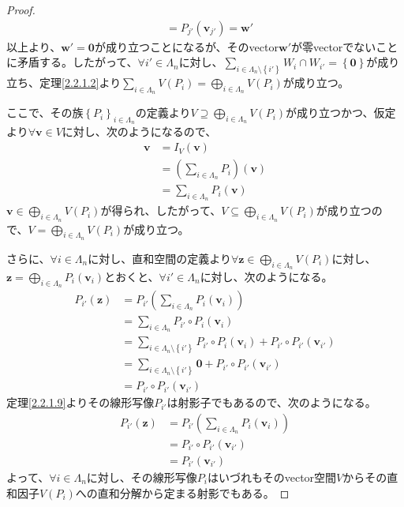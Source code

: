 \documentclass[dvipdfmx]{jsarticle}
\begin{document}
\begin{proof}
\begin{align*}
&= P_{j'}\left( \mathbf{v}_{j'} \right) = \mathbf{w}'
\end{align*}
以上より、$\mathbf{w}' = \mathbf{0}$が成り立つことになるが、そのvector$\mathbf{w}'$が零vectorでないことに矛盾する。したがって、$\forall i' \in \varLambda_{n}$に対し、$\sum_{i \in \varLambda_{n} \setminus \left\{ i' \right\}} W_{i} \cap W_{i'} = \left\{ \mathbf{0} \right\}$が成り立ち、定理\ref{2.2.1.2}より$\sum_{i \in \varLambda_{n}} {V\left( P_{i} \right)} = \bigoplus_{i \in \varLambda_{n}} {V\left( P_{i} \right)}$が成り立つ。\par
ここで、その族$\left\{ P_{i} \right\}_{i \in \varLambda_{n}}$の定義より$V \supseteq \bigoplus_{i \in \varLambda_{n}} {V\left( P_{i} \right)}$が成り立つかつ、仮定より$\forall\mathbf{v} \in V$に対し、次のようになるので、
\begin{align*}
\mathbf{v} &= I_{V}\left( \mathbf{v} \right)\\
&= \left( \sum_{i \in \varLambda_{n}} P_{i} \right)\left( \mathbf{v} \right)\\
&= \sum_{i \in \varLambda_{n}} {P_{i}\left( \mathbf{v} \right)}
\end{align*}
$\mathbf{v} \in \bigoplus_{i \in \varLambda_{n}} {V\left( P_{i} \right)}$が得られ、したがって、$V \subseteq \bigoplus_{i \in \varLambda_{n}} {V\left( P_{i} \right)}$が成り立つので、$V = \bigoplus_{i \in \varLambda_{n}} {V\left( P_{i} \right)}$が成り立つ。\par
さらに、$\forall i \in \varLambda_{n}$に対し、直和空間の定義より$\forall\mathbf{z} \in \bigoplus_{i \in \varLambda_{n}} {V\left( P_{i} \right)}$に対し、$\mathbf{z} = \bigoplus_{i \in \varLambda_{n}} {P_{i}\left( \mathbf{v}_{i} \right)}$とおくと、$\forall i' \in \varLambda_{n}$に対し、次のようになる。
\begin{align*}
P_{i'}\left( \mathbf{z} \right) &= P_{i'}\left( \sum_{i \in \varLambda_{n}} {P_{i}\left( \mathbf{v}_{i} \right)} \right)\\
&= \sum_{i \in \varLambda_{n}} {P_{i'} \circ P_{i}\left( \mathbf{v}_{i} \right)}\\
&= \sum_{i \in \varLambda_{n} \setminus \left\{ i' \right\}} {P_{i'} \circ P_{i}\left( \mathbf{v}_{i} \right)} + P_{i'} \circ P_{i'}\left( \mathbf{v}_{i'} \right)\\
&= \sum_{i \in \varLambda_{n} \setminus \left\{ i' \right\}} \mathbf{0} + P_{i'} \circ P_{i'}\left( \mathbf{v}_{i'} \right)\\
&= P_{i'} \circ P_{i'}\left( \mathbf{v}_{i'} \right)
\end{align*}
定理\ref{2.2.1.9}よりその線形写像$P_{i'}$は射影子でもあるので、次のようになる。
\begin{align*}
P_{i'}\left( \mathbf{z} \right) &= P_{i'}\left( \sum_{i \in \varLambda_{n}} {P_{i}\left( \mathbf{v}_{i} \right)} \right)\\
&= P_{i'} \circ P_{i'}\left( \mathbf{v}_{i'} \right)\\
&= P_{i'}\left( \mathbf{v}_{i'} \right)
\end{align*}
よって、$\forall i \in \varLambda_{n}$に対し、その線形写像$P_{i}$はいづれもそのvector空間$V$からその直和因子$V\left( P_{i} \right)$への直和分解から定まる射影でもある。
\end{proof}
\end{document}

